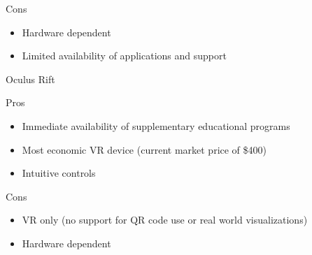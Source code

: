 \begin{description}
\begin{description}
	\item Cons
	\begin{itemize}
		\item Hardware dependent
		\item Limited availability of applications and support
	\end{itemize}
\end{description}
\item Oculus Rift
	\begin{description} 
	\item Pros
	\begin{itemize}
		\item Immediate availability of supplementary educational programs
		\item Most economic VR device (current market price of \$400)
		\item Intuitive controls
	\end{itemize}
\end{description}
\begin{description} 
	\item Cons
	\begin{itemize}
		\item VR only (no support for QR code use or real world visualizations)
		\item Hardware dependent
		
	\end{itemize}
\end{description}
\end{description}